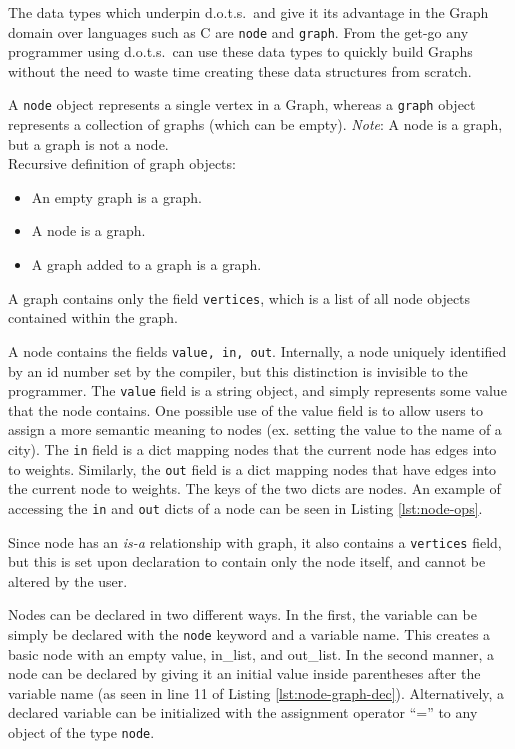 \documentclass{article}
\newcommand{\pltlang}{d.o.t.s.} %
\newcommand{\code}[1]{\texttt{#1}} %
\begin{document}
The data types which underpin \pltlang\ and give it its advantage in the Graph domain over languages such as C are \code{node} and \code{graph}. From the get-go any programmer using \pltlang\ can use these data types to quickly build Graphs without the need to waste time creating these data structures from scratch.

A \code{node} object represents a single vertex in a Graph, whereas a \code{graph} object represents a collection of graphs (which can be empty). \emph{Note}: A node is a graph, but a graph is not a node.\\

Recursive definition of graph objects:
\begin{itemize}
\item An empty graph is a graph.
\item A node is a graph.
\item A graph added to a graph is a graph.\\
\end{itemize}

A graph contains only the field \code{vertices}, which is a list of all node objects contained within the graph. 

A node contains the fields \code{value, in, out}. Internally, a node uniquely identified by an id number set by the compiler, but this distinction is invisible to the programmer. The \code{value} field is a string object, and simply represents some value that the node contains. One possible use of the value field is to allow users to assign a more semantic meaning to nodes (ex. setting the value to the name of a city). The \code{in} field is a dict mapping nodes that the current node has edges into to weights. Similarly, the \code{out} field is a dict mapping nodes that have edges into the current node to weights. The keys of the two dicts are nodes. An example of accessing the \code{in} and \code{out} dicts of a node can be seen in Listing \ref{lst:node-ops}.

Since node has an \emph{is-a} relationship with graph, it also contains a \code{vertices} field, but this is set upon declaration to contain only the node itself, and cannot be altered by the user.

Nodes can be declared in two different ways. In the first, the variable can be simply be declared with the \code{node} keyword and a variable name. This creates a basic node with an empty value, in\_list, and out\_list. In the second manner, a node can be declared by giving it an initial value inside parentheses after the variable name (as seen in line 11 of Listing \ref{lst:node-graph-dec}). Alternatively, a declared variable can be initialized with the assignment operator ``='' to any object of the type \code{node}.
\end{document}
